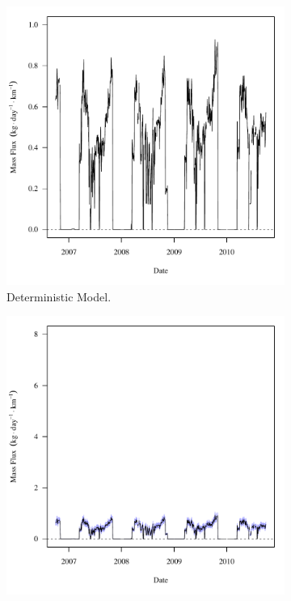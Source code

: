 \begin{linenumbers}
\begin{landscape}
\begin{figure}
\begin{subfigure}{0.7\textwidth}
			\includegraphics[width=\tableCustomSize]{"Figures/Results_USR/Deterministic/f RFR"}
			\caption{Deterministic Model.}
		\end{subfigure}%
		\begin{subfigure}{0.7\textwidth}
			\centering
			\includegraphics[width=\tableCustomSize]{"Figures/Results_USR/Stochastic/f RFR"}

\end{subfigure}
\end{figure}
\end{landscape}
\end{linenumbers}
